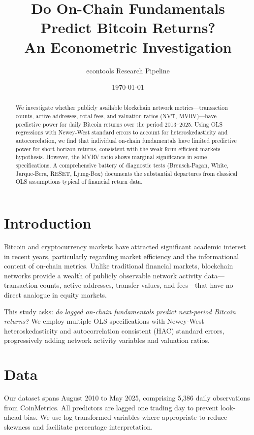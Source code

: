 \documentclass[12pt,a4paper]{article}
\title{Do On-Chain Fundamentals Predict Bitcoin Returns?\\
\large An Econometric Investigation}
\author{econtools Research Pipeline}
\date{\today}
\begin{document}
\maketitle

\begin{abstract}
We investigate whether publicly available blockchain network metrics---transaction
counts, active addresses, total fees, and valuation ratios (NVT, MVRV)---have
predictive power for daily Bitcoin returns over the period 2013--2025.
Using OLS regressions with Newey-West standard errors to account for
heteroskedasticity and autocorrelation, we find that individual on-chain
fundamentals have limited predictive power for short-horizon returns,
consistent with the weak-form efficient markets hypothesis. However,
the MVRV ratio shows marginal significance in some specifications.
A comprehensive battery of diagnostic tests (Breusch-Pagan, White,
Jarque-Bera, RESET, Ljung-Box) documents the substantial departures
from classical OLS assumptions typical of financial return data.
\end{abstract}

\section{Introduction}

Bitcoin and cryptocurrency markets have attracted significant academic interest
in recent years, particularly regarding market efficiency and the informational
content of on-chain metrics. Unlike traditional financial markets, blockchain
networks provide a wealth of publicly observable network activity data---transaction
counts, active addresses, transfer values, and fees---that have no direct analogue
in equity markets.

This study asks: \emph{do lagged on-chain fundamentals predict next-period
Bitcoin returns?} We employ multiple OLS specifications with Newey-West
heteroskedasticity and autocorrelation consistent (HAC) standard errors,
progressively adding network activity variables and valuation ratios.

\section{Data}

Our dataset spans August 2010 to May 2025,
comprising 5,386 daily observations from CoinMetrics. All predictors
are lagged one trading day to prevent look-ahead bias. We use log-transformed
variables where appropriate to reduce skewness and facilitate percentage
interpretation.
\end{document}
